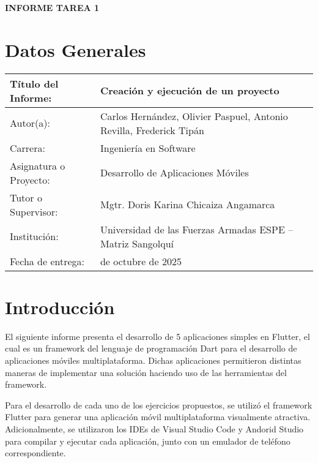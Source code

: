 \documentclass[12pt,letterpaper]{article}
\begin{document}
\renewcommand{\figurename}{Ilustración} 
{\textbf{\textcolor{azulOscuro}{INFORME TAREA 1}}}


{\setlength{\parskip}{0pt}
\section{Datos Generales}
}

\begin{tabularx}{\textwidth}{|>{\raggedright\arraybackslash}X|>{\raggedright\arraybackslash}X|}
\hline
Título del Informe: & Creación y ejecución de un proyecto \\
\hline
Autor(a): & Carlos Hernández, Olivier Paspuel, Antonio Revilla, Frederick Tipán\\
\hline
Carrera: & Ingeniería en Software \\
\hline
Asignatura o Proyecto: & Desarrollo de Aplicaciones Móviles \\
\hline
Tutor o Supervisor: & Mgtr. Doris Karina Chicaiza Angamarca\\
\hline
Institución: & Universidad de las Fuerzas Armadas ESPE – Matriz Sangolquí \\
\hline
Fecha de entrega: & 23 de octubre de 2025 \\
\hline
\end{tabularx}



\section{Introducción}

El siguiente informe presenta el desarrollo de 5 aplicaciones simples en Flutter, el cual es un framework del lenguaje de programación Dart para el desarrollo de aplicaciones móviles multiplataforma. Dichas aplicaciones permitieron distintas maneras de implementar una solución haciendo uso de las herramientas del framework.

Para el desarrollo de cada uno de los ejercicios propuestos, se utilizó el framework Flutter para generar una aplicación móvil multiplataforma visualmente atractiva. Adicionalmente, se utilizaron los IDEs de Visual Studio Code y Andorid Studio para compilar y ejecutar cada aplicación, junto con un emulador de teléfono correspondiente.
\end{document}
